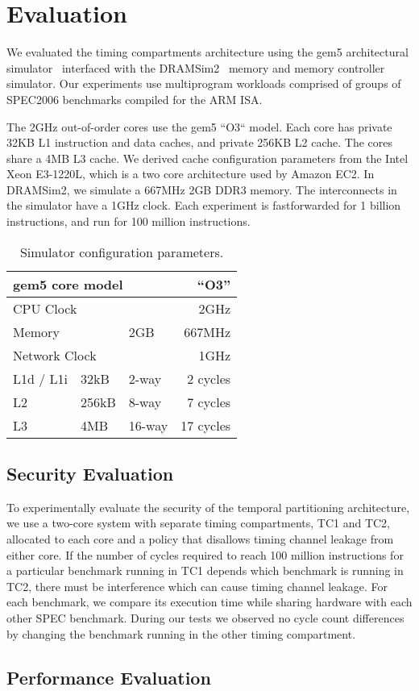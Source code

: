 \section{Evaluation}
We evaluated the timing compartments architecture using the gem5 architectural 
simulator~\cite{gem5} interfaced with the DRAMSim2~\cite{DRAMSim2} memory and 
memory controller simulator. Our experiments use multiprogram workloads 
comprised of groups of SPEC2006 benchmarks compiled for the ARM ISA. 

The 2GHz out-of-order cores use the gem5 ``O3`` model. 
Each core has private 32KB L1 instruction and data caches, and private 256KB L2 
cache. The cores share a 4MB L3 cache. We derived cache configuration 
parameters from the Intel Xeon E3-1220L, which is a two core architecture used 
by Amazon EC2. In DRAMSim2, we simulate a 667MHz 2GB DDR3 memory. The 
interconnects in the simulator have a 1GHz clock. Each experiment is 
fastforwarded for 1 billion instructions, and run for 100 million 
instructions.

\begin{table}
    \caption{Simulator configuration parameters.}
    \centering
    \begin{tabular}{|l|l|l|r|}
        \hline
        \multicolumn{3}{|l|}{gem5 core model} & ``O3''        \\\hline
        \multicolumn{3}{|l|}{CPU Clock}    & 2GHz             \\\hline
        \hline
        \multicolumn{2}{|l|}{Memory}             & 2GB    & 667MHz  \\\hline
        \hline
        \multicolumn{3}{|l|}{Network Clock}      & 1GHz \\\hline
        \hline
        L1d / L1i  & 32kB   & 2-way  & 2 cycles\\\hline
        L2         & 256kB  & 8-way  & 7 cycles \\\hline
        L3         & 4MB    & 16-way & 17 cycles  \\\hline
    \end{tabular}
    \label{tab:config}
\end{table}

\subsection{Security Evaluation}
To experimentally evaluate the security of the temporal partitioning 
architecture, we use a two-core system with separate timing compartments, TC1 
and TC2,
allocated to each core and a policy that disallows timing channel leakage from
either core. If the number of cycles required to reach 100 million instructions 
for a particular benchmark running in TC1 depends which benchmark is running in 
TC2, there must be interference which can cause timing channel leakage. For 
each benchmark, we compare its execution time while sharing hardware with each 
other SPEC benchmark. 
During our tests we observed no cycle count differences by changing the 
benchmark running in the other timing compartment.

\subsection{Performance Evaluation}
